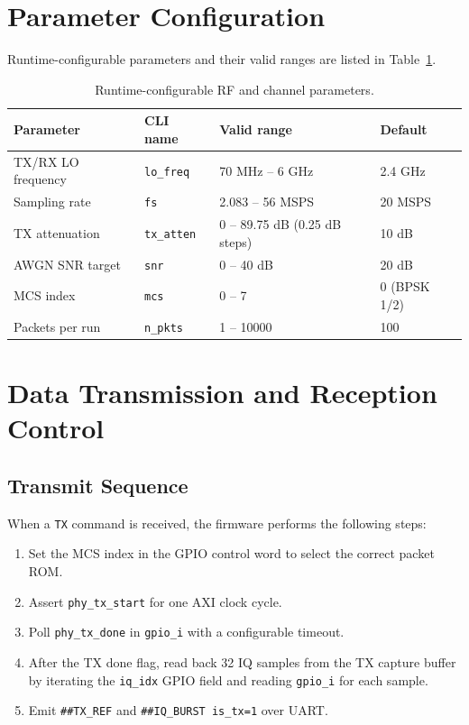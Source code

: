 \documentclass[12pt, a4paper, oneside]{report}
\begin{document}
\section{Parameter Configuration}

Runtime-configurable parameters and their valid ranges are listed in Table~\ref{tab:params}.

\begin{table}[H]
  \centering
  \caption{Runtime-configurable RF and channel parameters.}
  \label{tab:params}
  \begin{tabular}{llll}
    \toprule
    \textbf{Parameter} & \textbf{CLI name} & \textbf{Valid range} & \textbf{Default} \\
    \midrule
    TX/RX LO frequency & \texttt{lo\_freq}   & 70 MHz – 6 GHz     & 2.4 GHz \\
    Sampling rate       & \texttt{fs}         & 2.083 – 56 MSPS    & 20 MSPS \\
    TX attenuation      & \texttt{tx\_atten}  & 0 – 89.75 dB (0.25 dB steps) & 10 dB \\
    AWGN SNR target     & \texttt{snr}        & 0 – 40 dB          & 20 dB \\
    MCS index           & \texttt{mcs}        & 0 – 7              & 0 (BPSK 1/2) \\
    Packets per run     & \texttt{n\_pkts}    & 1 – 10000          & 100 \\
    \bottomrule
  \end{tabular}
\end{table}

\section{Data Transmission and Reception Control}

\subsection{Transmit Sequence}

When a \texttt{TX} command is received, the firmware performs the following steps:

\begin{enumerate}[noitemsep]
  \item Set the MCS index in the GPIO control word to select the correct packet ROM.
  \item Assert \texttt{phy\_tx\_start} for one AXI clock cycle.
  \item Poll \texttt{phy\_tx\_done} in \texttt{gpio\_i} with a configurable timeout.
  \item After the TX done flag, read back 32 IQ samples from the TX capture buffer by iterating the \texttt{iq\_idx} GPIO field and reading \texttt{gpio\_i} for each sample.
  \item Emit \texttt{\#\#TX\_REF} and \texttt{\#\#IQ\_BURST is\_tx=1} over UART.
\end{enumerate}
\end{document}

